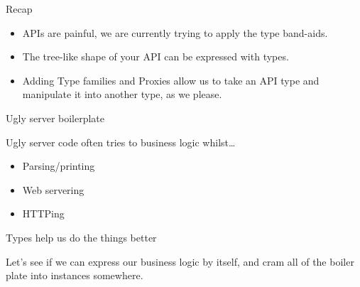 \documentclass[ignorenonframetext,]{beamer}
\begin{document}
\begin{frame}{Recap}

\begin{itemize}[<+->]
\itemsep1pt\parskip0pt
\item
  APIs are painful, we are currently trying to apply the type band-aids.
\item
  The tree-like shape of your API can be expressed with types.
\item
  Adding Type families and Proxies allow us to take an API type and
  manipulate it into another type, as we please.
\end{itemize}

\end{frame}

\begin{frame}{Ugly server boilerplate}

Ugly server code often tries to business logic whilst\ldots{}

\begin{itemize}[<+->]
\itemsep1pt\parskip0pt
\item
  Parsing/printing
\item
  Web servering
\item
  HTTPing
\end{itemize}

\end{frame}

\begin{frame}{Types help us do the things better}

Let's see if we can express our business logic by itself, and cram all
of the boiler plate into instances somewhere.

\end{frame}
\end{document}
